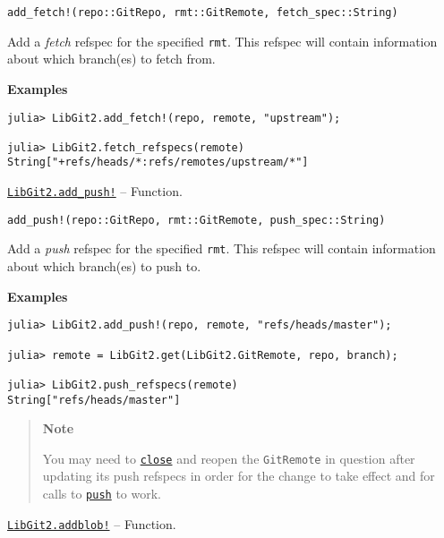 \begin{adjustwidth}{2em}{0pt}


\begin{verbatim}
add_fetch!(repo::GitRepo, rmt::GitRemote, fetch_spec::String)
\end{verbatim}

Add a \emph{fetch} refspec for the specified \texttt{rmt}. This refspec will contain information about which branch(es) to fetch from.

\textbf{Examples}


\begin{verbatim}
julia> LibGit2.add_fetch!(repo, remote, "upstream");

julia> LibGit2.fetch_refspecs(remote)
String["+refs/heads/*:refs/remotes/upstream/*"]
\end{verbatim}



\end{adjustwidth}
\hypertarget{2424007891894294055}{} 
\hyperlink{2424007891894294055}{\texttt{LibGit2.add\_push!}}  -- {Function.}

\begin{adjustwidth}{2em}{0pt}


\begin{verbatim}
add_push!(repo::GitRepo, rmt::GitRemote, push_spec::String)
\end{verbatim}

Add a \emph{push} refspec for the specified \texttt{rmt}. This refspec will contain information about which branch(es) to push to.

\textbf{Examples}


\begin{verbatim}
julia> LibGit2.add_push!(repo, remote, "refs/heads/master");

julia> remote = LibGit2.get(LibGit2.GitRemote, repo, branch);

julia> LibGit2.push_refspecs(remote)
String["refs/heads/master"]
\end{verbatim}

\begin{quote}
\textbf{Note}

You may need to \hyperlink{5331333469799487255}{\texttt{close}} and reopen the \texttt{GitRemote} in question after updating its push refspecs in order for the change to take effect and for calls to \hyperlink{9401118176170322302}{\texttt{push}} to work.

\end{quote}


\end{adjustwidth}
\hypertarget{12021530861844417654}{} 
\hyperlink{12021530861844417654}{\texttt{LibGit2.addblob!}}  -- {Function.}

